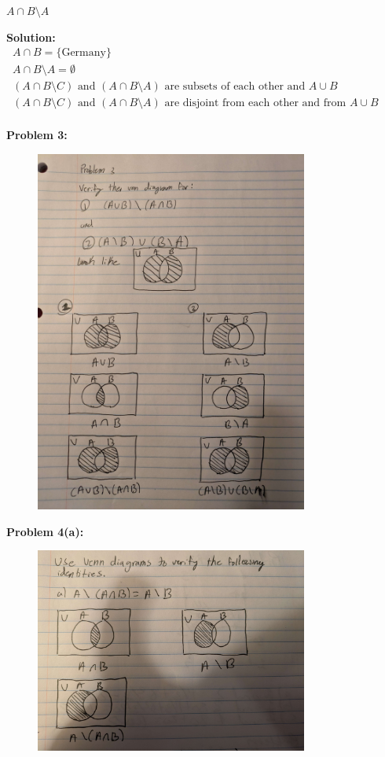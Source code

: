 \begin{tcolorbox}[title=Problem 2 (c), breakable]
$A \cap B \setminus A$
\end{tcolorbox}

\textbf{Solution:}
\begin{align*}
A \cap B = \text{\{Germany\}} & \\
A \cap B \setminus A = \emptyset && \\
(A \cap B \setminus C) \text{ and } (A \cap B \setminus A) \text{ are subsets of each other and } A \cup B& \\
(A \cap B \setminus C) \text{ and } (A \cap B \setminus A) \text{ are disjoint from each other and from } A \cup B& \\
\end{align*}

\textbf{Problem 3:}
\begin{figure}[H]
    \centering
    \includegraphics[width=0.8\textwidth]{images/1.2/1.jpg}
\end{figure}

\textbf{Problem 4(a):}
\begin{figure}[H]
    \centering
    \includegraphics[width=0.8\textwidth]{images/1.2/2.jpg}
\end{figure}

